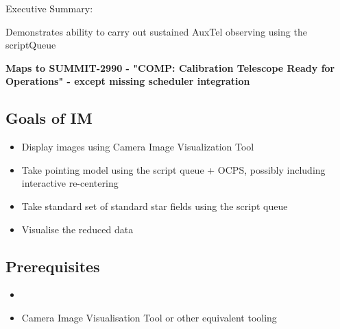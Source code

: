 
Executive Summary:

Demonstrates ability to carry out sustained AuxTel observing using the scriptQueue

\textbf{Maps to SUMMIT-2990 - "COMP: Calibration Telescope Ready for Operations" - except missing scheduler integration}

\subsection{Goals of IM}
\label{sec:orgbe41e90}
\begin{itemize}
\item Display images using Camera Image Visualization Tool
\item Take pointing model using the script queue + \gls{OCPS}, possibly including interactive re-centering
\item Take standard set of standard star fields using the script queue
\item Visualise the reduced data
\end{itemize}

\subsection{Prerequisites}

\begin{itemize}
\item{}
\item{Camera Image Visualisation Tool or other equivalent tooling}
\end{itemize}

